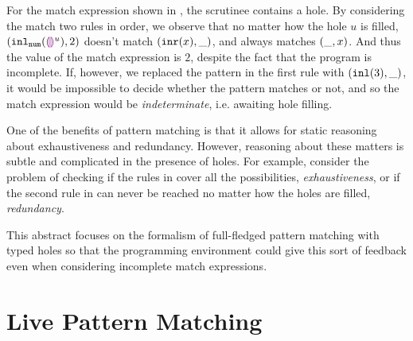 \documentclass[runningheads,envcountsame,a4paper]{llncs}
\begin{document}
For the match expression shown in , the scrutinee contains a hole.
By considering the match two rules in order, we observe that
no matter how the hole $u$ is filled, $(\mathtt{inl}_{\mathtt{num}}({\textcolor{violet}{\llparenthesis}\textcolor{violet}{\rrparenthesis}^{u}}) , 2)$ doesn't match $(\mathtt{inr}(x) , \_)$,
and always matches $(\_ , x)$. And thus the value of the match expression is $2$, despite the fact that the program is incomplete.
If, however, we replaced the pattern in the first rule with $(\mathtt{inl}(3), \_)$, it would be impossible to decide whether the pattern matches
or not, and so the match expression would be \emph{indeterminate}, i.e. awaiting hole filling.

One of the benefits of pattern matching is that it allows for static reasoning about exhaustiveness and redundancy.
However, reasoning about these matters is subtle and complicated in the presence of holes. 
For example, consider the problem of checking if the rules in  cover all the possibilities, \ie \emph{exhaustiveness}, or if the second rule in  can never be reached no matter how the holes are filled, \ie \emph{redundancy}. 

This abstract focuses on the formalism of full-fledged pattern matching with typed holes so that the programming environment could give this sort of feedback even when considering incomplete match expressions.

\section{Live Pattern Matching}
\end{document}
